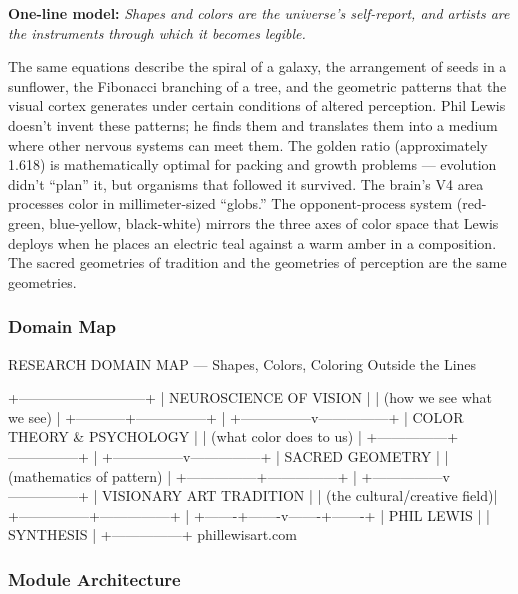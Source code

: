 \documentclass[11pt,letterpaper]{article}
\begin{document}
\textbf{One-line model:} \textit{Shapes and colors are the universe's self-report, and artists are the instruments through which it becomes legible.}

The same equations describe the spiral of a galaxy, the arrangement of seeds in a sunflower, the Fibonacci branching of a tree, and the geometric patterns that the visual cortex generates under certain conditions of altered perception. Phil Lewis doesn't invent these patterns; he finds them and translates them into a medium where other nervous systems can meet them. The golden ratio (approximately 1.618) is mathematically optimal for packing and growth problems --- evolution didn't ``plan'' it, but organisms that followed it survived. The brain's V4 area processes color in millimeter-sized ``globs.'' The opponent-process system (red-green, blue-yellow, black-white) mirrors the three axes of color space that Lewis deploys when he places an electric teal against a warm amber in a composition. The sacred geometries of tradition and the geometries of perception are the same geometries.

\subsubsection{Domain Map}

\begin{asciibox}
RESEARCH DOMAIN MAP — Shapes, Colors, Coloring Outside the Lines

        +---------------------------+
        |   NEUROSCIENCE OF VISION  |
        |  (how we see what we see) |
        +-----------+---------------+
                    |
    +---------------v---------------+
    |   COLOR THEORY \& PSYCHOLOGY   |
    |   (what color does to us)     |
    +---------------+---------------+
                    |
    +---------------v---------------+
    |     SACRED GEOMETRY           |
    |   (mathematics of pattern)    |
    +---------------+---------------+
                    |
    +---------------v---------------+
    |     VISIONARY ART TRADITION   |
    |  (the cultural/creative field)|
    +---------------+---------------+
                    |
    +-------+-------v-------+-------+
            |  PHIL LEWIS   |
            | SYNTHESIS     |
            +---------------+
                 phillewisart.com
\end{asciibox}

\subsubsection{Module Architecture}
\end{document}

